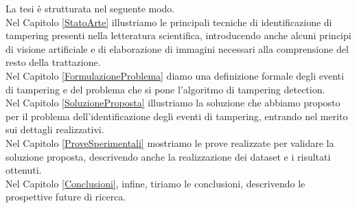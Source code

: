 %


\noindent La tesi \`e strutturata nel seguente modo.\\
Nel Capitolo \ref{StatoArte} illustriamo le principali tecniche di identificazione di tampering presenti nella letteratura scientifica, introducendo anche alcuni principi di visione artificiale e di elaborazione di immagini necessari alla comprensione del resto della trattazione.\\
Nel Capitolo \ref{FormulazioneProblema} diamo una definizione formale degli eventi di tampering e del problema che si pone l'algoritmo di tampering detection.\\
Nel Capitolo \ref{SoluzioneProposta} illustriamo la soluzione che abbiamo proposto per il problema dell'identificazione degli eventi di tampering, entrando nel merito sui dettagli realizzativi.\\
Nel Capitolo \ref{ProveSperimentali} mostriamo le prove realizzate per validare la soluzione proposta, descrivendo anche la realizzazione dei dataset e i risultati ottenuti.\\
Nel Capitolo \ref{Conclusioni}, infine, tiriamo le conclusioni, descrivendo le prospettive future di ricerca.
	
